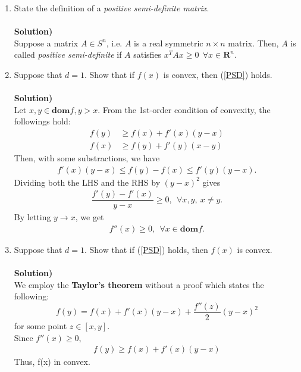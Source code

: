 \documentclass{article}
\begin{document}
\begin{enumerate}
\begin{enumerate}
\item State the definition of a \textit{positive semi-definite matrix}.\\\\
\textbf{Solution)}\\
Suppose a matrix $A \in S^n$, i.e. $A$ is a real symmetric $n \times n$ matrix. Then, $A$ is called \textit{positive semi-definite} if $A$ satisfies $x^T A x \geq 0~~ \forall x \in \mathbf{R}^n$.\\

\item Suppose that $d=1$. Show that if $f(x)$ is convex, then (\ref{PSD}) holds.\\\\
\textbf{Solution)}\\
Let $x,y \in \textbf{dom}f, y>x$. From the 1st-order condition of convexity, the followings hold:
\begin{align*}
f(y) &\geq f(x) + f'(x)(y-x) \\
f(x) &\geq f(y) + f'(y)(x-y)
\end{align*}
Then, with some substractions, we have
\begin{align*}
f'(x)(y-x) \leq f(y) - f(x) \leq f'(y)(y-x).
\end{align*}
Dividing both the LHS and the RHS by $(y-x)^2$ gives
\begin{align*}
\dfrac{f'(y)-f'(x)}{y-x} \geq 0, ~~ \forall x,y, ~ x\neq y.
\end{align*}
By letting $y \rightarrow x$, we get
\begin{align*}
f''(x) \geq 0, ~~\forall x \in \textbf{dom}f.
\end{align*}

\item Suppose that $d=1$. Show that if (\ref{PSD}) holds, then $f(x)$ is convex.\\\\
\textbf{Solution)}\\
We employ the \textbf{Taylor's theorem} without a proof which states the following:
\begin{equation*}
f(y) = f(x) + f'(x)(y-x) + \dfrac{f''(z)}{2}(y-x)^2
\end{equation*}
for some point $z \in [x,y]$.\\
Since $f''(x) \geq 0$,
\begin{align*}
f(y) \geq f(x) + f'(x)(y-x)
\end{align*}
Thus, f(x) in convex.


\end{enumerate}
\end{enumerate}
\end{document}
